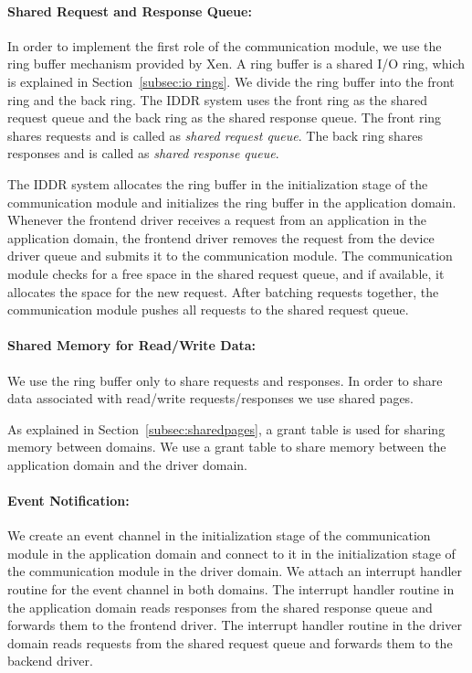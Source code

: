 \paragraph{Shared Request and Response Queue:}
In order to implement the first role of the communication module, we
use the ring buffer mechanism provided by Xen. A ring buffer is a shared
I/O ring, which is explained in Section~\ref{subsec:io rings}. We divide
the ring buffer into the front ring and the back ring. The IDDR system
uses the front ring as the shared request queue and the back ring as
the shared response queue. The front ring shares requests and is called
as \textit{shared request queue}. The back ring shares responses and is
called as \textit{shared response queue}.

The IDDR system allocates the ring buffer in the initialization stage
of the communication module and initializes the ring buffer in the
application domain. Whenever the frontend driver receives a request from
an application in the application domain, the frontend driver removes the
request from the device driver queue and submits it to the communication
module. The communication module checks for a free space in the shared
request queue, and if available, it allocates the space for the new
request. After batching requests together, the communication module
pushes all requests to the shared request queue.

\paragraph{Shared Memory for Read/Write Data:}
We use the ring buffer only to share requests and responses. In order
to share data associated with read/write requests/responses we use
shared pages.

As explained in Section~\ref{subsec:sharedpages}, a grant table is used
for sharing memory between domains. We use a grant table to share memory
between the application domain and the driver domain.

\paragraph{Event Notification:}
We create an event channel in the initialization stage of the
communication module in the application domain and connect to it in 
the initialization stage of the communication module
in the driver domain. We attach an interrupt handler routine for the
event channel in both domains. The interrupt handler routine in the 
application domain reads responses from the shared
response queue and forwards them to the frontend driver. The interrupt
handler routine in the driver domain reads requests from the shared
request queue and forwards them to the backend driver.

